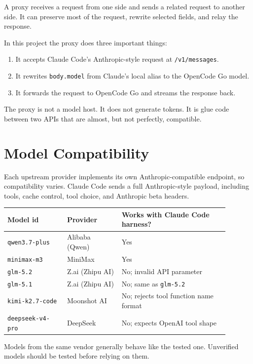 \documentclass[11pt,a4paper]{article}
\newcommand{\code}[1]{\texttt{#1}}
\begin{document}
A proxy receives a request from one side and sends a related request to another
side. It can preserve most of the request, rewrite selected fields, and relay
the response.

In this project the proxy does three important things:

\begin{enumerate}
  \item It accepts Claude Code's Anthropic-style request at \code{/v1/messages}.
  \item It rewrites \code{body.model} from Claude's local alias to the OpenCode Go model.
  \item It forwards the request to OpenCode Go and streams the response back.
\end{enumerate}

The proxy is not a model host. It does not generate tokens. It is glue code
between two APIs that are almost, but not perfectly, compatible.

\section{Model Compatibility}

Each upstream provider implements its own Anthropic-compatible endpoint, so
compatibility varies. Claude Code sends a full Anthropic-style payload,
including tools, cache control, tool choice, and Anthropic beta headers.

\begin{longtable}{|p{0.24\linewidth}|p{0.22\linewidth}|p{0.43\linewidth}|}
\hline
\textbf{Model id} & \textbf{Provider} & \textbf{Works with Claude Code harness?} \\
\hline
\code{qwen3.7-plus} & Alibaba (Qwen) & Yes \\
\hline
\code{minimax-m3} & MiniMax & Yes \\
\hline
\code{glm-5.2} & Z.ai (Zhipu AI) & No; invalid API parameter \\
\hline
\code{glm-5.1} & Z.ai (Zhipu AI) & No; same as \code{glm-5.2} \\
\hline
\code{kimi-k2.7-code} & Moonshot AI & No; rejects tool function name format \\
\hline
\code{deepseek-v4-pro} & DeepSeek & No; expects OpenAI tool shape \\
\hline
\end{longtable}

Models from the same vendor generally behave like the tested one. Unverified
models should be tested before relying on them.
\end{document}
